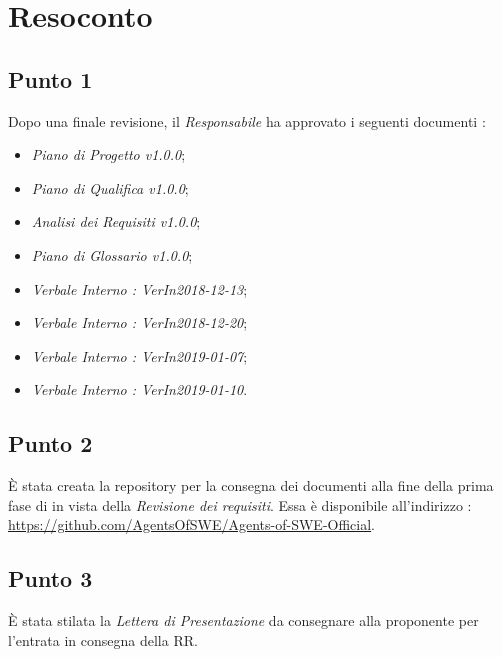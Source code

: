 \section{Resoconto}

\subsection{Punto 1}

Dopo una finale revisione, il \textit{Responsabile} ha approvato i seguenti documenti :
\begin{itemize}
	\item \textit{Piano di Progetto v1.0.0};
	\item \textit{Piano di Qualifica v1.0.0};
	\item \textit{Analisi dei Requisiti v1.0.0};
	\item \textit{Piano di Glossario v1.0.0};
	\item \textit{Verbale Interno : VerIn2018-12-13};
	\item \textit{Verbale Interno : VerIn2018-12-20};
	\item \textit{Verbale Interno : VerIn2019-01-07};
	\item \textit{Verbale Interno : VerIn2019-01-10}.
\end{itemize}

\subsection{Punto 2}
È stata creata la repository per la consegna dei documenti alla fine della prima fase di in vista della \textit{Revisione dei requisiti}. Essa è disponibile all'indirizzo : \url{https://github.com/AgentsOfSWE/Agents-of-SWE-Official}.

\subsection{Punto 3}
È stata stilata la \textit{Lettera di Presentazione} da consegnare alla proponente per l'entrata in consegna della RR.
